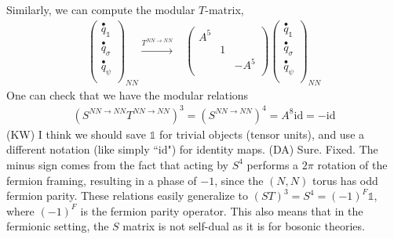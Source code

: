 \documentclass[12pt,a4paper]{article}
\newcounter{arrow}
\newcommand{\ra}{\rightarrow}
\newcommand{\unit}{\mathds{1}}
\newcommand{\kw}[1]{{\color{kwcolor}\footnotesize{(KW) #1}}}
\newcommand{\dave}[1]{{\color{ao(english)}\footnotesize{(DA) #1}}}
\begin{document}
Similarly, we can compute the modular $T$-matrix, 
\begin{align}
\left( \begin{matrix}
\overset{\bullet}{q}_\unit\\
\overset{\bullet}{q}_\sigma\\
\overset{\bullet}{q}_\psi\\
\end{matrix} \right)_{NN} 
\xrightarrow{T^{NN \rightarrow NN}} &\left( \begin{matrix}
A^5& &\\
&1&\\
&&-A^5\\
\end{matrix} \right)
\left( \begin{matrix}
\overset{\bullet}{q}_\unit\\
\overset{\bullet}{q}_\sigma\\
\overset{\bullet}{q}_\psi\\
\end{matrix} \right)_{NN}
\end{align}
One can check that we have the modular relations
\begin{align}
 (S^{NN\ra NN}T^{NN\ra NN})^3 = (S^{NN \ra NN})^4= A^{8}\text{id} = -\text{id}
 \end{align}
\kw{I think we should save $\unit$ for trivial objects (tensor units), and use a different notation
(like simply ``id") for identity maps.}
\dave{Sure. Fixed.}
The minus sign comes from the fact that acting by $S^4$ performs a $2\pi$ rotation 
of the fermion framing, resulting in a phase of $-1$, since the $(N,N)$ torus has odd fermion parity. 
These relations easily generalize to $(ST)^3=S^4=(-1)^F\unit$, where $(-1)^F$ is the fermion 
parity operator. 
This also means that in the fermionic setting, 
the $S$ matrix is not self-dual as it is for bosonic theories.


\medskip
\end{document}
